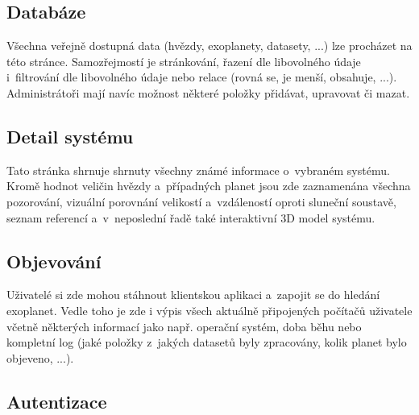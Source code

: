 \documentclass[a4paper,12pt]{article}
\begin{document}
{{{{{{{{{{

\subsection{Databáze}

Všechna veřejně dostupná data (hvězdy, exoplanety, datasety, ...) lze procházet na této stránce. Samozřejmostí je stránkování, řazení dle libovolného údaje i~filtrování dle libovolného údaje nebo relace (rovná se, je menší, obsahuje, ...). Administrátoři mají navíc možnost některé položky přidávat, upravovat či mazat.


\subsection{Detail systému}

Tato stránka shrnuje shrnuty všechny známé informace o~vybraném systému. Kromě hodnot veličin hvězdy a~případných planet jsou zde zaznamenána všechna pozorování, vizuální porovnání velikostí a~vzdáleností oproti sluneční soustavě, seznam referencí a~v~neposlední řadě také interaktivní 3D model systému.


\subsection{Objevování}

\vspace{-10pt}

Uživatelé si zde mohou stáhnout klientskou aplikaci a~zapojit se do hledání exoplanet. Vedle toho je zde i výpis všech aktuálně připojených počítačů uživatele včetně některých informací jako např. operační systém, doba běhu nebo kompletní log (jaké položky z~jakých datasetů byly zpracovány, kolik planet bylo objeveno, ...).


\vspace{-20pt}

\subsection{Autentizace}


}}}}}}}}}}
\end{document}
